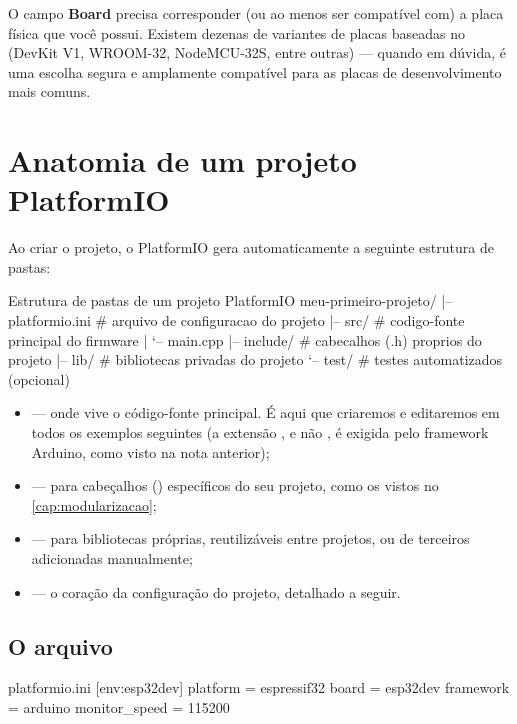 \begin{atencao}
O campo \textbf{Board} precisa corresponder (ou ao menos ser compatível com) a placa física que você possui. Existem dezenas de variantes de placas baseadas no \ESP{} (DevKit V1, WROOM-32, NodeMCU-32S, entre outras) — quando em dúvida,  é uma escolha segura e amplamente compatível para as placas de desenvolvimento mais comuns.
\end{atencao}

\section{Anatomia de um projeto PlatformIO}

Ao criar o projeto, o PlatformIO gera automaticamente a seguinte estrutura de pastas:

\begin{codigoini}{Estrutura de pastas de um projeto PlatformIO}
meu-primeiro-projeto/
|-- platformio.ini      # arquivo de configuracao do projeto
|-- src/                # codigo-fonte principal do firmware
|   `-- main.cpp
|-- include/             # cabecalhos (.h) proprios do projeto
|-- lib/                 # bibliotecas privadas do projeto
`-- test/                # testes automatizados (opcional)
\end{codigoini}

\begin{itemize}
    \item {} — onde vive o código-fonte principal. É aqui que criaremos e editaremos  em todos os exemplos seguintes (a extensão , e não , é exigida pelo framework Arduino, como visto na nota anterior);
    \item {} — para cabeçalhos () específicos do seu projeto, como os vistos no \cref{cap:modularizacao};
    \item {} — para bibliotecas próprias, reutilizáveis entre projetos, ou de terceiros adicionadas manualmente;
    \item {} — o coração da configuração do projeto, detalhado a seguir.
\end{itemize}

\subsection{O arquivo }

\begin{codigoini}{platformio.ini}
[env:esp32dev]
platform = espressif32
board = esp32dev
framework = arduino
monitor_speed = 115200
\end{codigoini}

